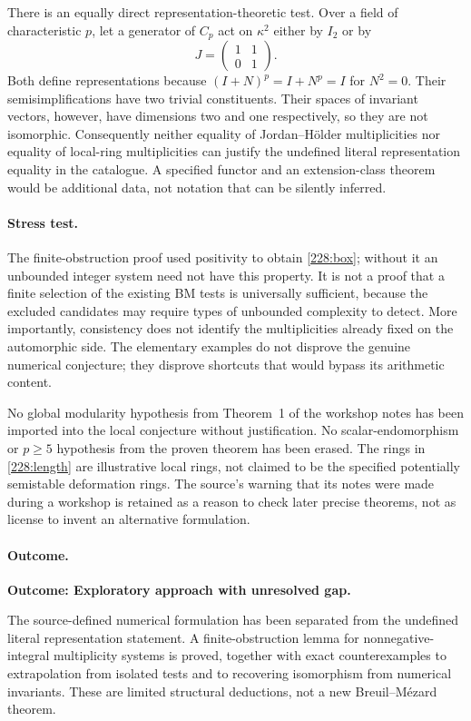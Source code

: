 \documentclass[11pt,a4paper]{article}
\numberwithin{equation}{section}
\begin{document}
There is an equally direct representation-theoretic test. Over a field
of characteristic $p$, let a generator of $C_p$ act on $\kappa^2$
either by $I_2$ or by
\[
 J=\begin{pmatrix}1&1\\0&1\end{pmatrix}.
\]
Both define representations because $(I+N)^p=I+N^p=I$ for $N^2=0$.
Their semisimplifications have two trivial constituents. Their spaces
of invariant vectors, however, have dimensions two and one respectively,
so they are not isomorphic. Consequently neither equality of
Jordan--H\"older multiplicities nor equality of local-ring multiplicities
can justify the undefined literal representation equality in the
catalogue. A specified functor and an extension-class theorem would be
additional data, not notation that can be silently inferred.

\paragraph{Stress test.}
The finite-obstruction proof used positivity to obtain
\eqref{228:box}; without it an unbounded integer system need not have
this property. It is not a proof that a finite selection of the existing
BM tests is universally sufficient, because the excluded candidates may
require types of unbounded complexity to detect. More importantly,
consistency does not identify the multiplicities already fixed on the
automorphic side. The elementary examples do not disprove the genuine
numerical conjecture; they disprove shortcuts that would bypass its
arithmetic content.

No global modularity hypothesis from Theorem~1 of the workshop notes
has been imported into the local conjecture without justification.
No scalar-endomorphism or $p\ge5$ hypothesis from the proven theorem
has been erased. The rings in \eqref{228:length} are illustrative local
rings, not claimed to be the specified potentially semistable
deformation rings. The source's warning that its notes were made during
a workshop is retained as a reason to check later precise theorems,
not as license to invent an alternative formulation.

\paragraph{Outcome.}
\textbf{Outcome: Exploratory approach with unresolved gap.}

The source-defined numerical formulation has been separated from the
undefined literal representation statement. A finite-obstruction lemma
for nonnegative-integral multiplicity systems is proved, together with
exact counterexamples to extrapolation from isolated tests and to
recovering isomorphism from numerical invariants. These are limited
structural deductions, not a new Breuil--M\'ezard theorem.
\end{document}
